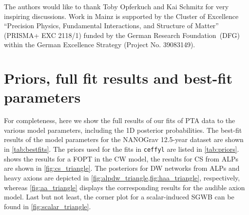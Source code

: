 \documentclass{article}
\begin{document}
\acknowledgments%

The authors would like to thank Toby Opferkuch and Kai Schmitz for very inspiring discussions. 
Work in Mainz is supported by the Cluster of Excellence “Precision Physics, Fundamental Interactions, and Structure of Matter” (PRISMA+ EXC 2118/1) funded by the German Research Foundation~(DFG) within the German Excellence Strategy (Project No. 39083149).

\appendix

\section{Priors, full fit results and best-fit parameters}
\label{app:triangle_plots}
For completeness, here we show the full results of our fits of PTA data to the various model parameters, including the 1D posterior probabilities.
The best-fit results of the model parameters for the NANOGrav 12.5-year dataset are shown in \cref{tab:bestfits}.
The priors used for the fits in \texttt{ceffyl} are listed in \cref{tab:priors}.
 shows the results for a FOPT in the CW model, the results for CS from ALPs are shown in \cref{fig:cs_triangle}. The posteriors for DW networks from ALPs and heavy axions are depicted in \cref{fig:alpdw_triangle,fig:haa_triangle}, respectively, whereas \cref{fig:aa_triangle} displays the corresponding results for the audible axion model.
Last but not least, the corner plot for a scalar-induced SGWB can be found in \cref{fig:scalar_triangle}.
\end{document}
